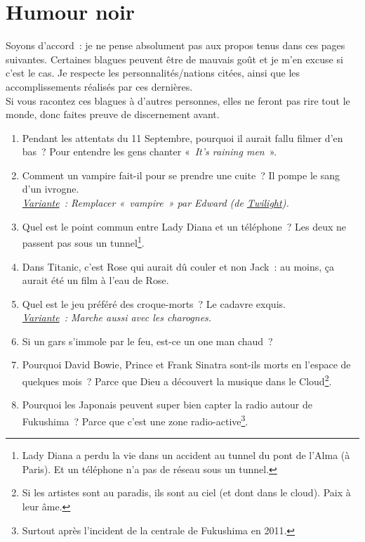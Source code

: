 \documentclass[10pt,a5paper,fullpage]{book}
\begin{document}
	\chapter{Humour noir}
	Soyons d'accord~: je ne pense absolument pas aux propos tenus dans ces pages suivantes. Certaines blagues peuvent être de mauvais goût et je m'en excuse si c'est le cas. Je respecte les personnalités/nations citées, ainsi que les accomplissements réalisés par ces dernières. \\ 
	Si vous racontez ces blagues à d'autres personnes, elles ne feront pas rire tout le monde, donc faites preuve de discernement avant. 
	\newpage
	\begin{enumerate}
		\item Pendant les attentats du 11 Septembre, pourquoi il aurait fallu filmer d’en bas~? Pour entendre les gens chanter «~\textit{It’s raining men}~».
		\item Comment un vampire fait-il pour se prendre une cuite~? Il pompe le sang d’un ivrogne. 
		\\\textit{\underline{Variante}~: Remplacer «~vampire~» par Edward (de \underline{Twilight}).}
		\item Quel est le point commun entre Lady Diana et un téléphone~? Les deux ne passent pas sous un tunnel\footnote{Lady Diana a perdu la vie dans un accident au tunnel du pont de l'Alma (à Paris). Et un téléphone n'a pas de réseau sous un tunnel.}.
		\item Dans Titanic, c’est Rose qui aurait dû couler et non Jack~: au moins, ça aurait été un film à l’eau de Rose.
		\item Quel est le jeu préféré des croque-morts~? Le cadavre exquis.
		\\\textit{\underline{Variante}~: Marche aussi avec les charognes.}
		\item Si un gars s’immole par le feu, est-ce un one man chaud~?
		\item Pourquoi David Bowie, Prince et Frank Sinatra sont-ils morts en l’espace de quelques mois~? Parce que Dieu a découvert la musique dans le Cloud\footnote{Si les artistes sont au paradis, ils sont au ciel (et dont dans le cloud). Paix à leur âme.}.
		\item Pourquoi les Japonais peuvent super bien capter la radio autour de Fukushima~? Parce que c'est une zone radio-active\footnote{Surtout après l'incident de la centrale de Fukushima en 2011.}. 

\end{enumerate}
\end{document}
